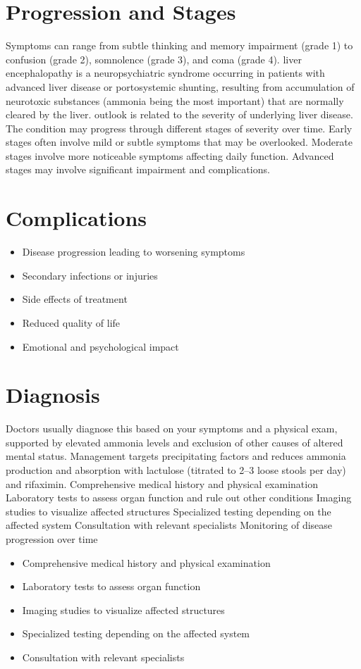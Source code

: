 \section{Progression and Stages}
Symptoms can range from subtle thinking and memory impairment (grade 1) to confusion (grade 2), somnolence (grade 3), and coma (grade 4). liver encephalopathy is a neuropsychiatric syndrome occurring in patients with advanced liver disease or portosystemic shunting, resulting from accumulation of neurotoxic substances (ammonia being the most important) that are normally cleared by the liver. outlook is related to the severity of underlying liver disease. The condition may progress through different stages of severity over time. Early stages often involve mild or subtle symptoms that may be overlooked. Moderate stages involve more noticeable symptoms affecting daily function. Advanced stages may involve significant impairment and complications.
\section{Complications}
\begin{itemize}[noitemsep]
  \item Disease progression leading to worsening symptoms
  \item Secondary infections or injuries
  \item Side effects of treatment
  \item Reduced quality of life
  \item Emotional and psychological impact
\end{itemize}
\section{Diagnosis}
Doctors usually diagnose this based on your symptoms and a physical exam, supported by elevated ammonia levels and exclusion of other causes of altered mental status. Management targets precipitating factors and reduces ammonia production and absorption with lactulose (titrated to 2--3 loose stools per day) and rifaximin. Comprehensive medical history and physical examination Laboratory tests to assess organ function and rule out other conditions Imaging studies to visualize affected structures Specialized testing depending on the affected system Consultation with relevant specialists Monitoring of disease progression over time

\begin{itemize}[noitemsep]
  \item Comprehensive medical history and physical examination
  \item Laboratory tests to assess organ function
  \item Imaging studies to visualize affected structures
  \item Specialized testing depending on the affected system
  \item Consultation with relevant specialists
\end{itemize}
